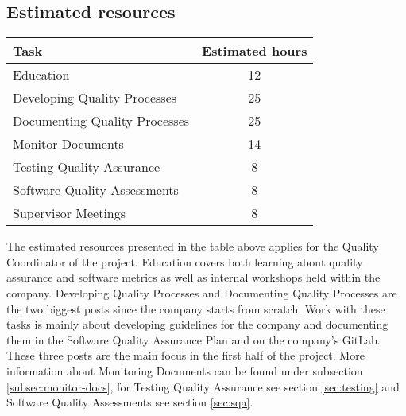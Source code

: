 \subsection{Estimated resources}
\begin{table}[!ht]
\centering
\begin{tabular}{ | l | c |}
    \hline
Task & Estimated hours\\
\hline
Education & 12\\
Developing Quality Processes & 25\\
Documenting Quality Processes & 25\\
Monitor Documents & 14\\
Testing Quality Assurance & 8\\
Software Quality Assessments & 8\\
Supervisor Meetings & 8\\
\hline
\end{tabular}
\end{table}
\noindent The estimated resources presented in the table above applies for the Quality Coordinator of the project. Education covers both learning about quality assurance and software metrics as well as internal workshops held within the company. Developing Quality Processes and Documenting Quality Processes are the two biggest posts since the company starts from scratch. Work with these tasks is mainly about developing guidelines for the company and documenting them in the Software Quality Assurance Plan and on the company's GitLab. These three posts are the main focus in the first half of the project. More information about Monitoring Documents can be found under subsection \ref{subsec:monitor-docs}, for Testing Quality Assurance see section \ref{sec:testing} and Software Quality Assessments see section \ref{sec:sqa}.


